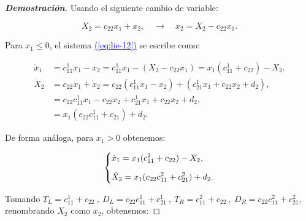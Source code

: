 \documentclass[12pt,a4paper]{report} %
\newcommand{\eref}[1]{\hyperref[#1]{\textcolor{blue}{(\ref*{#1})}}}
\newcommand{\eref}[1]{\hyperref[#1]{\textcolor{blue}{\textit{(\ref*{#1})}}}}
\begin{document}
	\vspace{0.5cm}\begin{proof}[\textbf{Demostración}]
	Usando el siguiente cambio de variable:
	
	\begin{equation}
		\label{eq:cambioo}
		X_2=c_{22}x_1+x_2,\quad \rightarrow \quad x_2=X_2-c_{22}x_1.
	\end{equation}\smallskip
	
	\noindent Para $x_1\leq 0$, el sistema \eref{eq:lie-12} se escribe como:
	
		\begin{equation}
		\label{eq:cambio2}
		\begin{aligned}
			\dot{x}_1&=c_{11}^1x_1-x_2=c_{11}^1x_1-(X_2-c_{22}x_1)=x_1(c_{11}^1+c_{22})-X_2. \\[2mm]
			\dot{X}_2&=c_{22}\dot{x}_1+\dot{x}_2=c_{22}(c_{11}^1x_1-x_2)+(c_{21}^1x_1+c_{22}x_2+d_2), \\[2mm]
			&=c_{22}c_{11}^1x_1-c_{22}x_2+c_{21}^1x_1+c_{22}x_2+d_2, \\[2mm]
			&=x_1(c_{22}c_{11}^1+c_{21})+d_2.
		\end{aligned}
		\end{equation}\smallskip
	
	\noindent De forma análoga, para $x_1>0$ obtenemos:
	
	\begin{equation}
		\label{eq:cambio22}
		\scalebox{1}{$\displaystyle
			\left\{
			\begin{aligned}
				&\dot{x}_1=x_1(c_{11}^2+c_{22})-X_2, \\[2mm]
				&\dot{X}_2=x_1(c_{22}c_{11}^2+c_{21}^2)+d_2.
			\end{aligned}
			\right.
			$}
	\end{equation}\smallskip
	
 	\noindent Tomando $T_L=c_{11}^1+c_{22} \: , \: D_L=c_{22}c_{11}^1+c_{21}^1 \: , \:  T_R=c_{11}^2+c_{22} \: , \: D_R=c_{22}c_{11}^2+c_{21}^2$, renombrando $X_2$ como $x_2$, obtenemos:
	

\end{proof}
\end{document}
